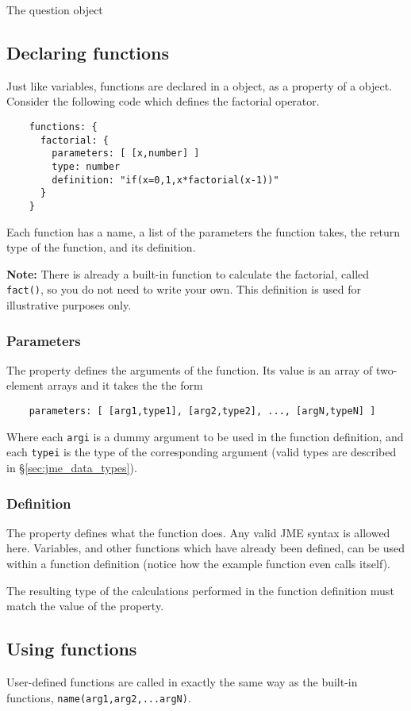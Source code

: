 \begin{chapter}{\label{cha:question_object}The question object}
  \subsection{Declaring functions}
  Just like variables, functions are declared in a 
  object, as a property of a  object.  Consider the
  following code which defines the factorial operator.
  \begin{Verbatim}
    functions: {
      factorial: {
        parameters: [ [x,number] ]
        type: number
        definition: "if(x=0,1,x*factorial(x-1))"
      }
    }
  \end{Verbatim}
  Each function has a name, a list of the parameters the function takes, the
  return type of the function, and its definition.

  \textbf{Note:} There is already a built-in function to calculate the
  factorial, called \verb"fact()", so you do not need to write your own.  This
  definition is used for illustrative purposes only.

  \subsubsection{Parameters}
  The  property defines the arguments of the function.
  Its value is an array of two-element arrays and it takes the the form
  \begin{Verbatim}
    parameters: [ [arg1,type1], [arg2,type2], ..., [argN,typeN] ]
  \end{Verbatim}
  Where each \verb"argi" is a dummy argument to be used in the function
  definition, and each \verb"typei" is the type of the corresponding argument
  (valid types are described in \S\ref{sec:jme_data_types}).

  \subsubsection{Definition}
  The  property defines what the function does.  Any valid
  JME syntax is allowed here.  Variables, and other functions which have
  already been defined, can be used within a function definition (notice how
  the example function even calls itself).

  The resulting type of the calculations performed in the function definition
  must match the value of the  property.

  \subsection{Using functions}
  User-defined functions are called in exactly the same way as the built-in
  functions, \eg \verb"name(arg1,arg2,...argN)".


\end{chapter}
